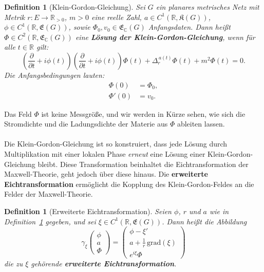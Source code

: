 \documentclass[11pt,a4paper,leqno]{report}
\newtheorem{definition}[theorem]{Definition}
\numberwithin{equation}{chapter}
\begin{document}
\begin{definition}[Klein-Gordon-Gleichung]\label{def:klein_gordon}
	Sei \(G\) ein planares metrisches Netz mit Metrik \(r : E \to \mathbb{R}_{>0}\), 
	\(m > 0\) eine reelle Zahl, \(a \in C^1(\mathbb{R}, \mathfrak{K}(G))\), 
	\(\phi \in C^1(\mathbb{R}, \mathfrak{E}(G))\), sowie \(\Phi_0, v_0 \in \mathfrak{E}_\mathbb{C}(G)\) 
	Anfangsdaten. Dann heißt \(\Phi \in C^2(\mathbb{R}, \mathfrak{E}_\mathbb{C}(G))\) eine 
	\textbf{Lösung der Klein-Gordon-Gleichung}, wenn für alle \(t \in \mathbb{R}\) gilt:
	\begin{equation}\label{eq:klein_gordon}
		\left(\frac{\partial}{\partial t} + i\phi(t)\right)
		\left(\frac{\partial}{\partial t} + i\phi(t)\right)\Phi(t)
		+ \Delta_r^{\,a(t)} \Phi(t) + m^2 \Phi(t) = 0.
	\end{equation}
	Die Anfangsbedingungen lauten:
	\begin{align}
		\Phi(0) &= \Phi_0, \label{eq:kg_init1}\\
		\Phi'(0) &= v_0. \label{eq:kg_init2}
	\end{align}
\end{definition}
\noindent
Das Feld \(\Phi\) ist keine Messgröße, und wir werden in Kürze sehen, wie sich die 
Stromdichte und die Ladungsdichte der Materie aus \(\Phi\) ableiten lassen.\\
\\
Die Klein-Gordon-Gleichung ist so konstruiert, dass jede Lösung durch Multiplikation 
mit einer lokalen Phase \emph{erneut} eine Lösung einer
Klein-Gordon-Gleichung bleibt. Diese Transformation beinhaltet die Eichtransformation 
der Maxwell-Theorie, geht jedoch über diese hinaus. Die \textbf{erweiterte Eichtransformation} 
ermöglicht die Kopplung des Klein-Gordon-Feldes an die Felder der Maxwell-Theorie.
\begin{definition}[Erweiterte Eichtransformation]\label{def:erw_eich}
	Seien \(\phi\), \(r\) und \(a\) wie in Definition~\ref{def:klein_gordon} gegeben, 
	und sei \(\xi \in C^1(\mathbb{R}, \mathfrak{E}(G))\). Dann heißt die Abbildung
	\begin{equation}\label{eq:erw_eich}
		\gamma_\xi
		\begin{pmatrix}
			\phi \\[4pt]
			a \\[4pt]
			\Phi
		\end{pmatrix}
		=
		\begin{pmatrix}
			\phi - \xi' \\[4pt]
			a + \frac{1}{r}\,\mathrm{grad}(\xi) \\[4pt]
			e^{i\xi}\Phi
		\end{pmatrix}
	\end{equation}
	die zu \(\xi\) gehörende \textbf{erweiterte Eichtransformation}.
\end{definition}
\end{document}
